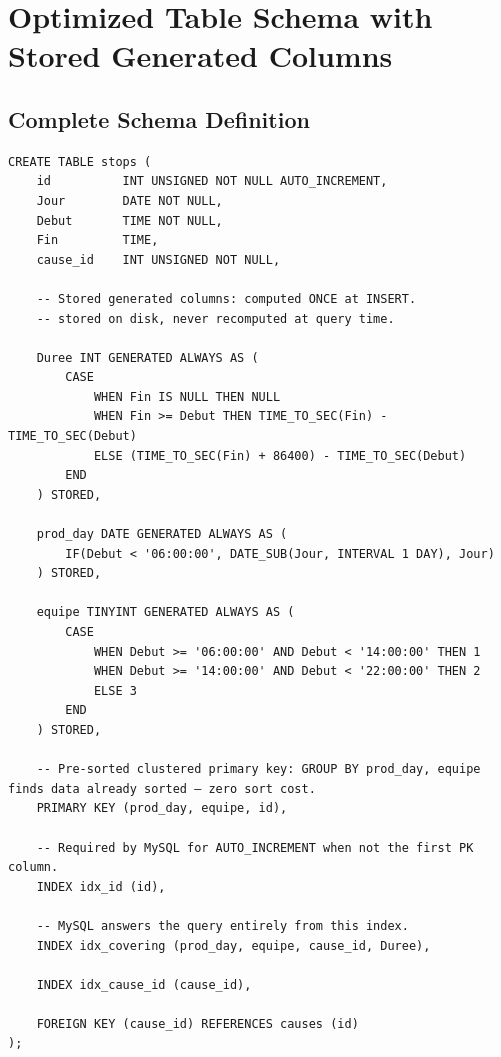 \chapter{Optimized Table Schema with Stored Generated Columns}
\label{app:optimized_schema_b}

\section{Complete Schema Definition}

\begin{verbatim}
CREATE TABLE stops (
    id          INT UNSIGNED NOT NULL AUTO_INCREMENT,
    Jour        DATE NOT NULL,
    Debut       TIME NOT NULL,
    Fin         TIME,
    cause_id    INT UNSIGNED NOT NULL,

    -- Stored generated columns: computed ONCE at INSERT.
    -- stored on disk, never recomputed at query time.

    Duree INT GENERATED ALWAYS AS (
        CASE
            WHEN Fin IS NULL THEN NULL
            WHEN Fin >= Debut THEN TIME_TO_SEC(Fin) - TIME_TO_SEC(Debut)
            ELSE (TIME_TO_SEC(Fin) + 86400) - TIME_TO_SEC(Debut)
        END
    ) STORED,

    prod_day DATE GENERATED ALWAYS AS (
        IF(Debut < '06:00:00', DATE_SUB(Jour, INTERVAL 1 DAY), Jour)
    ) STORED,

    equipe TINYINT GENERATED ALWAYS AS (
        CASE
            WHEN Debut >= '06:00:00' AND Debut < '14:00:00' THEN 1
            WHEN Debut >= '14:00:00' AND Debut < '22:00:00' THEN 2
            ELSE 3
        END
    ) STORED,

    -- Pre-sorted clustered primary key: GROUP BY prod_day, equipe finds data already sorted — zero sort cost.
    PRIMARY KEY (prod_day, equipe, id),

    -- Required by MySQL for AUTO_INCREMENT when not the first PK column.
    INDEX idx_id (id),

    -- MySQL answers the query entirely from this index.
    INDEX idx_covering (prod_day, equipe, cause_id, Duree),

    INDEX idx_cause_id (cause_id),

    FOREIGN KEY (cause_id) REFERENCES causes (id)
);
\end{verbatim}
